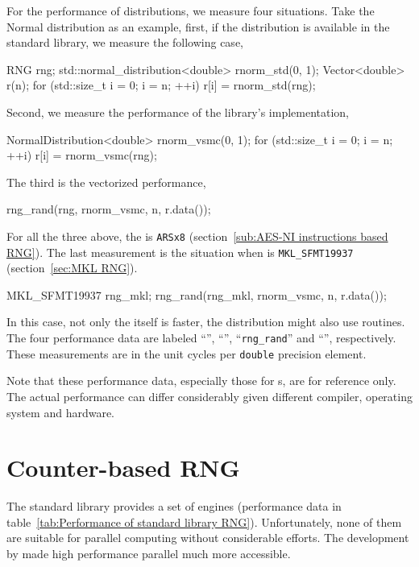 For the performance of distributions, we measure four situations. Take the
Normal distribution as an example, first, if the distribution is available in
the standard library, we measure the following case,
\begin{cppcode}
  RNG rng;
  std::normal_distribution<double> rnorm_std(0, 1);
  Vector<double> r(n);
  for (std::size_t i = 0; i = n; ++i)
      r[i] = rnorm_std(rng);
\end{cppcode}
Second, we measure the performance of the \vsmc library's implementation,
\begin{cppcode}
  NormalDistribution<double> rnorm_vsmc(0, 1);
  for (std::size_t i = 0; i = n; ++i)
      r[i] = rnorm_vsmc(rng);
\end{cppcode}
The third is the vectorized performance,
\begin{cppcode}
  rng_rand(rng, rnorm_vsmc, n, r.data());
\end{cppcode}
For all the three above, the \rng is \verb|ARSx8| (section~\ref{sub:AES-NI
  instructions based RNG}). The last measurement is the situation when \rng is
\verb|MKL_SFMT19937| (section~\ref{sec:MKL RNG}).
\begin{cppcode}
  MKL_SFMT19937 rng_mkl;
  rng_rand(rng_mkl, rnorm_vsmc, n, r.data());
\end{cppcode}
In this case, not only the \rng itself is faster, the distribution might also
use \mkl routines. The four performance data are labeled ``\std'', ``\vsmc'',
``\verb|rng_rand|'' and ``\mkl'', respectively. These measurements are in the
unit cycles per \verb|double| precision element.

Note that these performance data, especially those for \rng{}s, are for
reference only. The actual performance can differ considerably given different
compiler, operating system and hardware.

\section{Counter-based RNG}
\label{sec:Counter-based RNG}

The standard library provides a set of \rng engines (performance data in
table~\ref{tab:Performance of standard library RNG}). Unfortunately, none of
them are suitable for parallel computing without considerable efforts. The
development by \textcite{Salmon:2011um} made high performance parallel \rng
much more accessible.

